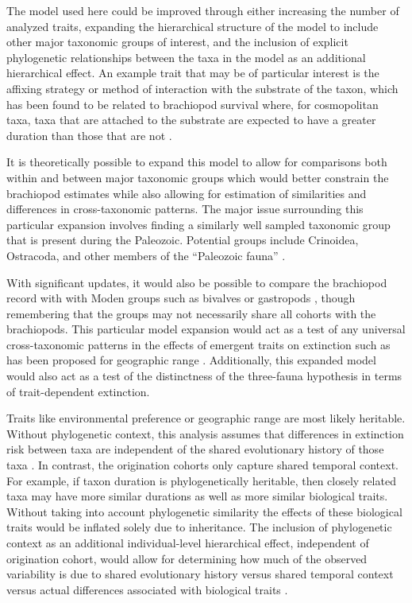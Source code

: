 \documentclass{article}
\begin{document}
The model used here could be improved through either increasing the number of analyzed traits, expanding the hierarchical structure of the model to include other major taxonomic groups of interest, and the inclusion of explicit phylogenetic relationships between the taxa in the model as an additional hierarchical effect. An example trait that may be of particular interest is the affixing strategy or method of interaction with the substrate of the taxon, which has been found to be related to brachiopod survival where, for cosmopolitan taxa, taxa that are attached to the substrate are expected to have a greater duration than those that are not \citep{Alexander1977}.

It is theoretically possible to expand this model to allow for comparisons both within and between major taxonomic groups which would better constrain the brachiopod estimates while also allowing for estimation of similarities and differences in cross-taxonomic patterns. The major issue surrounding this particular expansion involves finding a similarly well sampled taxonomic group that is present during the Paleozoic. Potential groups include Crinoidea, Ostracoda, and other members of the ``Paleozoic fauna'' \citep{Sepkoski1981a}.

With significant updates, it would also be possible to compare the brachiopod record with with Moden groups such as bivalves or gastropods \citep{Sepkoski1981a}, though remembering that the groups may not necessarily share all cohorts with the brachiopods. This particular model expansion would act as a test of any universal cross-taxonomic patterns in the effects of emergent traits on extinction such as has been proposed for geographic range \citep{Payne2007}. Additionally, this expanded model would also act as a test of the distinctness of the \citet{Sepkoski1981a} three-fauna hypothesis in terms of trait-dependent extinction.

Traits like environmental preference or geographic range \citep{Jablonski1987,Hunt2005b} are most likely heritable. Without phylogenetic context, this analysis assumes that differences in extinction risk between taxa are independent of the shared evolutionary history of those  taxa \citep{Felsenstein1985b}. In contrast, the origination cohorts only capture shared temporal context. For example, if taxon duration is phylogenetically heritable, then closely related taxa may have more similar durations as well as more similar biological traits. Without taking into account phylogenetic similarity the effects of these biological traits would be inflated solely due to inheritance. The inclusion of phylogenetic context as an additional individual-level hierarchical effect, independent of origination cohort, would allow for determining how much of the observed variability is due to shared evolutionary history versus shared temporal context versus actual differences associated with biological traits \citep{Smits2015}.
\end{document}
